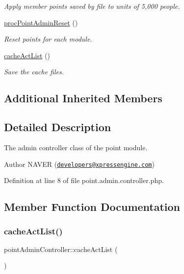 \begin{DoxyCompactItemize}
\begin{DoxyCompactList}\small\item\em Apply member points saved by file to units of 5,000 people. \end{DoxyCompactList}\item 
\hyperlink{classpointAdminController_ab5131a2b0dd2fe07086034dceb9ae26f}{proc\+Point\+Admin\+Reset} ()
\begin{DoxyCompactList}\small\item\em Reset points for each module. \end{DoxyCompactList}\item 
\hyperlink{classpointAdminController_aa1c2fcf15f52f425ff5e36337f8d5c4f}{cache\+Act\+List} ()
\begin{DoxyCompactList}\small\item\em Save the cache files. \end{DoxyCompactList}\end{DoxyCompactItemize}
\subsection*{Additional Inherited Members}


\subsection{Detailed Description}
The admin controller class of the point module. 

\begin{DoxyAuthor}{Author}
N\+A\+V\+ER (\href{mailto:developers@xpressengine.com}{\tt developers@xpressengine.\+com}) 
\end{DoxyAuthor}


Definition at line 8 of file point.\+admin.\+controller.\+php.



\subsection{Member Function Documentation}
\mbox{\label{classpointAdminController_aa1c2fcf15f52f425ff5e36337f8d5c4f}} 
\subsubsection{\texorpdfstring{cache\+Act\+List()}{cacheActList()}}
{\footnotesize\ttfamily point\+Admin\+Controller\+::cache\+Act\+List (\begin{DoxyParamCaption}{ }\end{DoxyParamCaption})}



